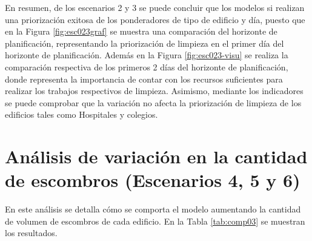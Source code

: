 \documentclass[12pt,a4paper]{article}
\begin{document}
En resumen, de los escenarios 2 y 3 se puede concluir que los modelos si realizan una priorización exitosa de los ponderadores de tipo de edificio y día, puesto que en la Figura \ref{fig:esc023graf} se muestra una comparación del horizonte de planificación, representando la priorización de limpieza en el primer día del horizonte de planificación. Además en la Figura \ref{fig:esc023-visu} se realiza la comparación respectiva de los primeros 2 días del horizonte de planificación, donde representa la importancia de contar con los recursos suficientes para realizar los trabajos respectivos de limpieza. Asimismo, mediante los indicadores se puede comprobar que la variación no afecta la priorización de limpieza de los edificios tales como Hospitales y colegios.

\section{Análisis de variación en la cantidad de escombros (Escenarios 4, 5 y 6)}

En este análisis se detalla cómo se comporta el modelo aumentando la cantidad de volumen de escombros de cada edificio. En la Tabla \ref{tab:comp03} se muestran los resultados.
\end{document}
